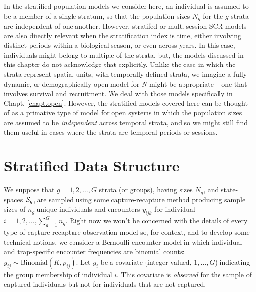 In the stratified population models we consider here, an individual is
assumed to be a member of a single stratum, so that the population
sizes $N_{g}$ for the $g$ strata  are independent of one another. However,
stratifed or multi-session SCR models are also directly relevant when
the stratification index is time, either involving distinct periods within
a biological season, or even across years. In this case, individuals
might belong to multiple of the strata, but, the models discussed in
this chapter do not acknowledge that explicitly.
Unlike the case in which the strata represent spatial units, with
temporally defined strata, we imagine a fully dynamic, or
demographically open model for $N$ might be appropriate -- one that
involves survival and recruitment. We deal with those models
specifically in Chapt. \ref{chapt.open}.  However, the stratified
models covered here can be thought of as a primative type of model for
open systems in which the population sizes are assumed to be {\it
  independent} across temporal strata, and so we might still find them
useful in cases where the strata are temporal periods or sessions.

\section{Stratified Data Structure}


We suppose that $g=1,2,\ldots,G$ strata (or groups), having sizes
$N_{g}$, and state-spaces ${\cal S}_{g}$, are sampled using some
capture-recapture method producing sample sizes of $n_{g}$ unique
individuals and encounters $y_{ijk}$ for individual $i=1,2,\ldots,
\sum_{g=1}^{G} n_{g}$.  Right now we won't be concerned with the
details of every type of capture-recapture observation model so, for
context, and to develop some technical notions, we consider a
Bernoulli encounter model in which individual and trap-specific
encounter frequencies are binomial counts: $y_{ij} \sim
\mbox{Binomial}(K,p_{ij})$.  Let $g_{i}$ be a covariate
(integer-valued, $1, \ldots, G$) indicating the group membership of
individual $i$. This covariate is {\it observed} for the sample of
captured individuals but not for individuals that are not captured.


